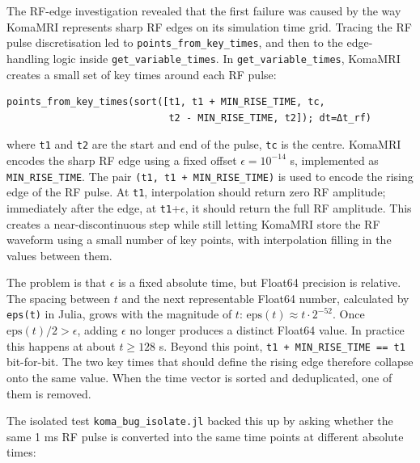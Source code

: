 The RF-edge investigation revealed that the first failure was caused by the way
KomaMRI represents sharp RF edges on its simulation time grid. Tracing the RF
pulse discretisation led to \texttt{points\_\allowbreak from\_\allowbreak key\_\allowbreak times}, and then to the
edge-handling logic inside \texttt{get\_variable\_times}. In
\texttt{get\_variable\_times}, KomaMRI creates a small set of key times around
each RF pulse:

\begin{verbatim}
points_from_key_times(sort([t1, t1 + MIN_RISE_TIME, tc,
                            t2 - MIN_RISE_TIME, t2]); dt=Δt_rf)
\end{verbatim}

where \texttt{t1} and \texttt{t2} are the start and end of the pulse,
\texttt{tc} is the centre. KomaMRI encodes the sharp RF edge using a fixed
offset $\epsilon = 10^{-14}$ s, implemented as
\texttt{MIN\_RISE\_TIME}. The pair \texttt{(t1, t1 + MIN\_RISE\_TIME)}
is used to encode the rising edge of the
RF pulse. At \texttt{t1}, interpolation should return zero RF amplitude;
immediately after the edge, at \texttt{t1}+$\epsilon$, it should return
the full RF amplitude. This creates a near-discontinuous step while still
letting KomaMRI store the RF waveform using a small number of key points, with
interpolation filling in the values between them.

The problem is that $\epsilon$ is a fixed absolute time, but Float64 precision
is relative. The spacing between $t$ and the next representable Float64 number,
calculated by \texttt{eps(t)} in Julia, grows with the magnitude of $t$:
$\mathrm{eps}(t) \approx t\cdot2^{-52}$. Once
$\mathrm{eps}(t)/2 > \epsilon$, adding $\epsilon$ no longer produces a distinct
Float64 value. In practice this happens at about $t \geq 128$ s. Beyond this
point, \texttt{t1 + MIN\_RISE\_TIME == t1} bit-for-bit. The two key times that
should define the rising edge therefore collapse onto the same value. When the
time vector is sorted and deduplicated, one of them is removed.

The isolated test \texttt{koma\_bug\_isolate.jl} backed this up by asking
whether the same 1 ms RF pulse is converted into the same time points at
different absolute times:

